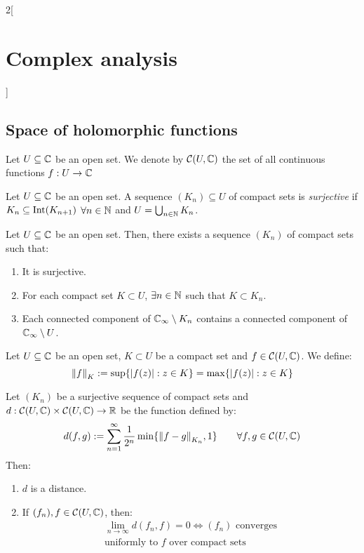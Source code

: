 \documentclass[../../../main_math.tex]{subfiles}
\begin{document}
\begin{multicols}{2}[\section{Complex analysis}]
  \subsection{Space of holomorphic functions}
  \begin{definition}
    Let $U\subseteq\mathbb{C}$ be an open set. We denote by $\mathcal{C}(U,\mathbb{C})$ the set of all continuous functions $f:U\rightarrow\mathbb{C}$
  \end{definition}
  \begin{definition}
    Let $U\subseteq\mathbb{C}$ be an open set. A sequence $(K_n)\subseteq U$ of compact sets is \emph{surjective} if $K_n\subseteq \operatorname{Int}(K_{n+1})$ $\forall n\in\mathbb{N}$ and $U=\bigcup_{n\in\mathbb{N}}K_n$.
  \end{definition}
  \begin{proposition}
    Let $U\subseteq\mathbb{C}$ be an open set. Then, there exists a sequence $(K_n)$ of compact sets such that:
    \begin{enumerate}
      \item It is surjective.
      \item For each compact set $K\subset U$, $\exists n\in\mathbb{N}$ such that $K\subset K_n$.
      \item Each connected component of $\mathbb{C}_\infty\setminus K_n$ contains a connected component of $\mathbb{C}_\infty\setminus U$.
    \end{enumerate}
  \end{proposition}
  \begin{definition}
    Let $U\subseteq\mathbb{C}$ be an open set, $K\subset U$ be a compact set and $f\in\mathcal{C}(U,\mathbb{C})$. We define: $${\|f\|}_K:=\sup\{\abs{f(z)}:z\in K\}=\max\{\abs{f(z)}:z\in K\}$$
  \end{definition}
  \begin{theorem}
    Let $(K_n)$ be a surjective sequence of compact sets and $d:\mathcal{C}(U,\mathbb{C})\times\mathcal{C}(U,\mathbb{C})\rightarrow\mathbb{R}$ be the function defined by:
    $$d(f,g):=\sum_{n=1}^\infty\frac{1}{2^n}\min\{{\|f-g\|}_{K_n},1\}\qquad\forall f,g\in\mathcal{C}(U,\mathbb{C})$$ Then:
    \begin{enumerate}
      \item $d$ is a distance.
      \item If $(f_n),f\in\mathcal{C}(U,\mathbb{C})$, then:
            \begin{multline*}
              \lim_{n\to\infty}d(f_n,f)= 0\iff (f_n)\text{ converges}\\ \text{uniformly to }f\text{ over compact sets}
            \end{multline*}

\end{enumerate}
\end{theorem}
\end{multicols}
\end{document}

